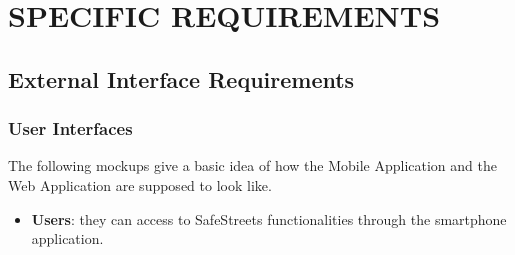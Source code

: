 \documentclass[12pt,a4paper]{article}
\begin{document}
\section{SPECIFIC	REQUIREMENTS}
\subsection{External	Interface	Requirements} 
\subsubsection{User	Interfaces}
The following mockups give a basic idea of how the Mobile Application and the Web Application are supposed to look like.
\begin {itemize}
	\item \textbf{Users}: they can access to SafeStreets functionalities through the smartphone application.					
		\begin{figure}[H]
			\centering
			\quad
			\quad

\end{figure}
\end{itemize}
\end{document}
